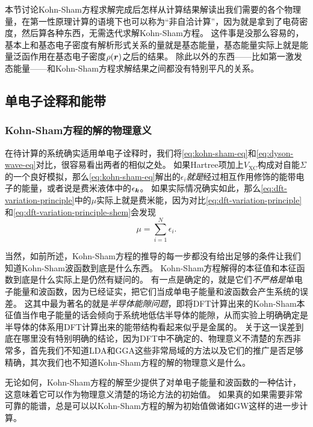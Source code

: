 本节讨论Kohn-Sham方程求解完成后怎样从计算结果解读出我们需要的各个物理量，在第一性原理计算的语境下也可以称为“非自洽计算”，因为就是拿到了电荷密度，然后算各种东西，无需迭代求解Kohn-Sham方程。
这件事是没那么容易的，基本上和基态电子密度有解析形式关系的量就是基态能量，基态能量实际上就是能量泛函作用在基态电子密度$\rho(\vb*{r})$之后的结果。
除此以外的东西——比如第一激发态能量——和Kohn-Sham方程求解结果之间都没有特别平凡的关系。


\subsection{单电子诠释和能带}\label{sec:single-electron-in-dft}

\subsubsection{Kohn-Sham方程的解的物理意义}

在待计算的系统确实适用单电子诠释时，我们将\eqref{eq:kohn-sham-eq}和\eqref{eq:dyson-wave-eq}对比，很容易看出两者的相似之处。
如果Hartree项加上$V_\text{XC}$构成对自能$\Sigma$的一个良好模拟，那么\eqref{eq:kohn-sham-eq}解出的$\epsilon_i$\emph{就是}经过相互作用修饰的能带电子的能量，或者说是费米液体中的$\epsilon_{\vb*{k}}$。
如果实际情况确实如此，那么\eqref{eq:dft-variation-principle}中的$\mu$实际上就是费米能，因为对比\eqref{eq:dft-variation-principle}和\eqref{eq:dft-variation-principle-shem}会发现
\begin{equation}
    \mu = \sum_{i=1}^N \epsilon_i.
\end{equation}

当然，如前所述，Kohn-Sham方程的推导的每一步都没有给出足够的条件让我们知道Kohn-Sham波函数到底是什么东西。
Kohn-Sham方程解得的本征值和本征函数到底是什么实际上是仍然有疑问的。
有一点是确定的，就是它们\emph{不严格是}单电子能量和波函数，因为已经证实，把它们当成单电子能量和波函数会产生系统的误差。
这其中最为著名的就是\emph{半导体能隙问题}，即将DFT计算出来的Kohn-Sham本征值当作电子能量的话会倾向于系统地低估半导体的能隙，从而实验上明确确定是半导体的体系用DFT计算出来的能带结构看起来似乎是金属的。
关于这一误差到底在哪里没有特别明确的结论，因为DFT中不确定的、物理意义不清楚的东西非常多，首先我们不知道LDA和GGA这些非常局域的方法以及它们的推广是否足够精确，其次我们也不知道Kohn-Sham方程的解的物理意义是什么。

无论如何，Kohn-Sham方程的解至少提供了对单电子能量和波函数的一种估计，这意味着它可以作为物理意义清楚的场论方法的初始值。
如果真的如果需要非常可靠的能谱，总是可以以Kohn-Sham方程的解为初始值做诸如GW这样的进一步计算。

